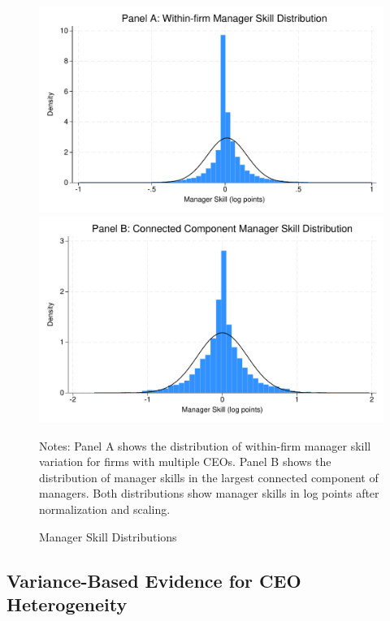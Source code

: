 \documentclass[11pt,a4paper]{article}
\begin{document}
\begin{figure}[htbp]
\centering
\begin{minipage}{0.48\textwidth}
\centering
\includegraphics[width=\textwidth]{figure/manager_skill_within.pdf}
\end{minipage}
\hfill
\begin{minipage}{0.48\textwidth}
\centering
\includegraphics[width=\textwidth]{figure/manager_skill_connected.pdf}
\end{minipage}
\caption{Manager Skill Distributions}
\label{fig:manager_skills_appendix}
\footnotesize
Notes: Panel A shows the distribution of within-firm manager skill variation for firms with multiple CEOs. Panel B shows the distribution of manager skills in the largest connected component of managers. Both distributions show manager skills in log points after normalization and scaling.
\end{figure}



\subsection{Variance-Based Evidence for CEO Heterogeneity}
\end{document}

